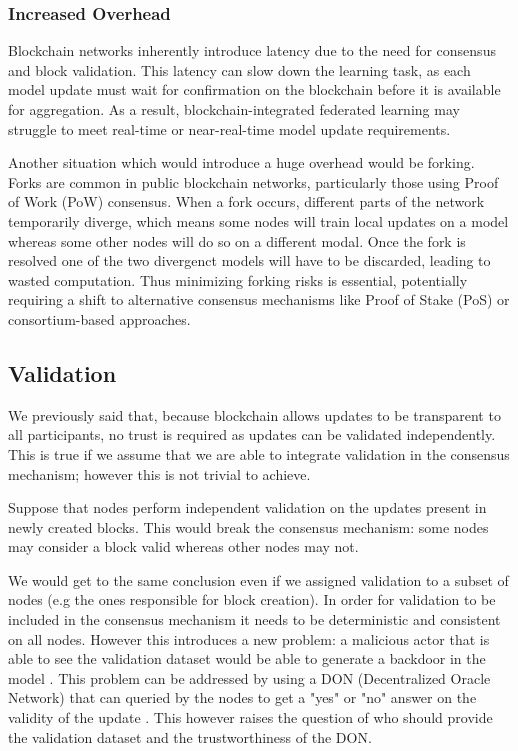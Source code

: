 \subsubsection{Increased Overhead}
Blockchain networks inherently introduce latency due to the need for consensus and block validation.
This latency can slow down the learning task, as each model update must wait for
confirmation on the blockchain before it is available for aggregation. As a result,
blockchain-integrated federated learning may struggle to meet real-time or near-real-time
model update requirements.

Another situation which would introduce a huge overhead would be forking.
Forks are common in public blockchain networks, particularly those using
Proof of Work (PoW) consensus. When a fork occurs, different parts of the network temporarily
diverge, which means some nodes will train local updates on a model whereas some other nodes will do so on a
different modal.
Once the fork is resolved one of the two divergenct models will have to be discarded, leading to wasted computation.
Thus minimizing forking risks is essential, potentially requiring a shift to alternative consensus mechanisms
like Proof of
Stake (PoS) or consortium-based approaches.

\subsection{Validation}
We previously said that, because blockchain allows updates to be transparent to all participants, no trust is
required as updates can be validated independently.
This is true if we assume that we are able to integrate validation in the consensus mechanism; however this
is not trivial to achieve.

Suppose that nodes perform independent validation on the updates present in newly created blocks.
This would break the consensus mechanism: some nodes may consider a block valid whereas other nodes may not.

We would get to the same conclusion even if we assigned validation to a subset of nodes (e.g the ones
responsible for block creation).
In order for validation to be included in the consensus mechanism it needs to be deterministic and consistent
on all nodes.
However this introduces a new problem: a malicious actor that is able to see the validation dataset would be
able to generate a
backdoor in the model \cite{backdoorFL}.
This problem can be addressed by using a DON (Decentralized Oracle Network) that can queried by the nodes to
get a "yes" or "no" answer on the validity of the update \cite{Prof}.
This however raises the question of who should provide the validation dataset and the trustworthiness of the DON.


